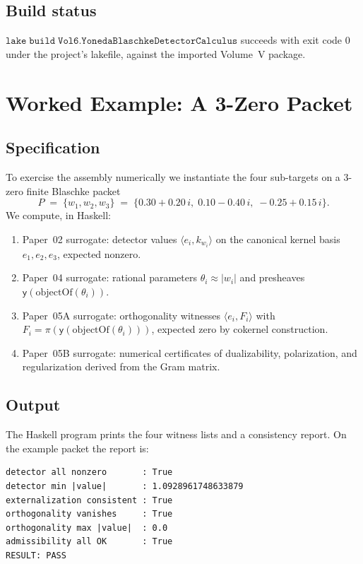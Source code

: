 \documentclass[12pt]{article}
\theoremstyle{plain}
\theoremstyle{definition}
\theoremstyle{remark}
\newcommand{\Yon}{\mathsf{y}}
\begin{document}
\subsection{Build status}

\(\mathtt{lake\;build\;Vol6.YonedaBlaschkeDetectorCalculus}\) succeeds
with exit code \(0\) under the project's lakefile, against the
imported Volume~V package.

\section{Worked Example: A 3-Zero Packet}
\label{sec:haskell}

\subsection{Specification}

To exercise the assembly numerically we instantiate the four
sub-targets on a 3-zero finite Blaschke packet
\[
  P \;=\; \{ w_{1}, w_{2}, w_{3} \}
       \;=\; \{ 0.30 + 0.20\,i,\; 0.10 - 0.40\,i,\; -0.25 + 0.15\,i \}.
\]
We compute, in Haskell:

\begin{enumerate}
  \item Paper~02 surrogate: detector values
        \(\langle e_{i}, k_{w_{i}}\rangle\) on the canonical kernel
        basis \(e_{1}, e_{2}, e_{3}\), expected nonzero.
  \item Paper~04 surrogate: rational parameters
        \(\theta_{i} \approx |w_{i}|\) and presheaves
        \(\Yon(\mathrm{objectOf}(\theta_{i}))\).
  \item Paper~05A surrogate: orthogonality witnesses
        \(\langle e_{i}, F_{i}\rangle\) with \(F_{i} =
        \pi(\Yon(\mathrm{objectOf}(\theta_{i})))\), expected zero by
        cokernel construction.
  \item Paper~05B surrogate: numerical certificates of dualizability,
        polarization, and regularization derived from the Gram matrix.
\end{enumerate}

\subsection{Output}

The Haskell program prints the four witness lists and a consistency
report. On the example packet the report is:

\begin{verbatim}
detector all nonzero       : True
detector min |value|       : 1.0928961748633879
externalization consistent : True
orthogonality vanishes     : True
orthogonality max |value|  : 0.0
admissibility all OK       : True
RESULT: PASS
\end{verbatim}
\end{document}

